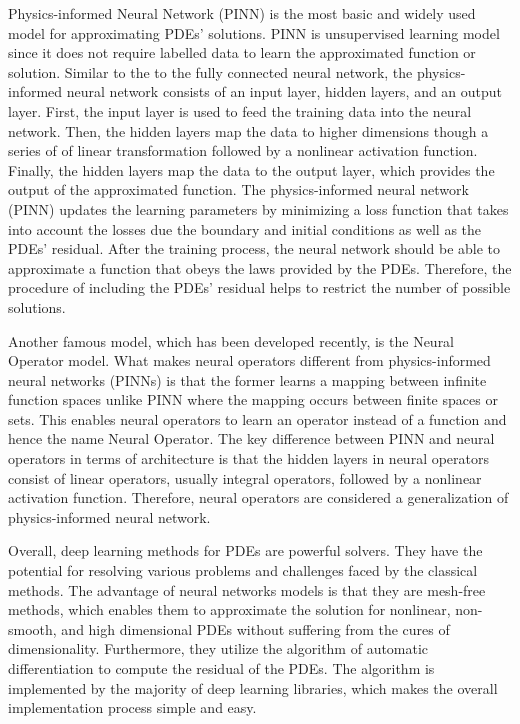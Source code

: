 \documentclass[a4paper, onecolumn, 12pt]{article}
\begin{document}
Physics-informed Neural Network (PINN) is the most basic and widely used model for approximating PDEs' solutions. PINN is unsupervised learning model since it does not require labelled data to learn the approximated function or solution. Similar to the to the fully connected neural network, the physics-informed neural network consists of an input layer, hidden layers, and an output layer. First, the input layer is used to feed the training data into the neural network.  Then, the hidden layers map the data to higher dimensions though a series of of linear transformation followed by a nonlinear activation function. Finally, the hidden layers map the data to the output layer, which provides the output of the approximated function. The physics-informed neural network (PINN) updates the learning parameters by minimizing a loss function that takes into account the losses due the boundary and initial conditions as well as the PDEs' residual. After the training process, the neural network should be able to approximate a function that obeys the laws provided by the PDEs. Therefore, the procedure of including the PDEs' residual helps to restrict the number of possible solutions. 

Another famous model, which has been developed recently, is the Neural Operator model. 
What makes neural operators different from physics-informed neural networks (PINNs) is that the former learns a mapping between infinite function spaces unlike PINN where the mapping occurs between finite spaces or sets. 
This enables neural operators to learn an operator instead of a function and hence the name Neural Operator.
The key difference between PINN and neural operators in terms of architecture is that the hidden layers in neural operators consist of linear operators, usually integral operators, followed by a nonlinear activation function. Therefore, neural operators are considered a generalization of physics-informed neural network.

Overall, deep learning methods for PDEs are powerful solvers. 
They have the potential for resolving various problems and challenges faced by the classical methods. 
The advantage of neural networks models is that they are mesh-free methods, which enables them to approximate the solution for nonlinear, non-smooth, and high dimensional PDEs without suffering from the cures of dimensionality. Furthermore, they utilize the algorithm of automatic differentiation to compute the residual of the PDEs. The algorithm is implemented by the majority of deep learning libraries, which makes the overall implementation process simple and easy. 
\end{document}
